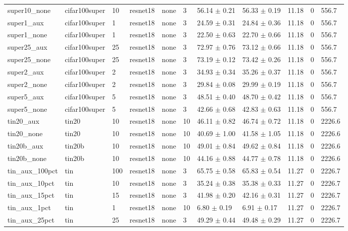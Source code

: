 \begin{tabular}{lllllllllll}
super10_none & cifar100super & 10 & resnet18 & none & 3 & 56.14 $\pm$ 0.21 & 56.33 $\pm$ 0.19 & 11.18 & 0 & 556.7 \\
super1_aux & cifar100super & 1 & resnet18 & none & 3 & 24.59 $\pm$ 0.31 & 24.84 $\pm$ 0.36 & 11.18 & 0 & 556.7 \\
super1_none & cifar100super & 1 & resnet18 & none & 3 & 22.50 $\pm$ 0.63 & 22.70 $\pm$ 0.66 & 11.18 & 0 & 556.7 \\
super25_aux & cifar100super & 25 & resnet18 & none & 3 & 72.97 $\pm$ 0.76 & 73.12 $\pm$ 0.66 & 11.18 & 0 & 556.7 \\
super25_none & cifar100super & 25 & resnet18 & none & 3 & 73.19 $\pm$ 0.12 & 73.42 $\pm$ 0.26 & 11.18 & 0 & 556.7 \\
super2_aux & cifar100super & 2 & resnet18 & none & 3 & 34.93 $\pm$ 0.34 & 35.26 $\pm$ 0.37 & 11.18 & 0 & 556.7 \\
super2_none & cifar100super & 2 & resnet18 & none & 3 & 29.84 $\pm$ 0.08 & 29.99 $\pm$ 0.19 & 11.18 & 0 & 556.7 \\
super5_aux & cifar100super & 5 & resnet18 & none & 3 & 48.51 $\pm$ 0.40 & 48.70 $\pm$ 0.42 & 11.18 & 0 & 556.7 \\
super5_none & cifar100super & 5 & resnet18 & none & 3 & 42.66 $\pm$ 0.68 & 42.83 $\pm$ 0.63 & 11.18 & 0 & 556.7 \\
tin20_aux & tin20 & 10 & resnet18 & none & 10 & 46.11 $\pm$ 0.82 & 46.74 $\pm$ 0.72 & 11.18 & 0 & 2226.6 \\
tin20_none & tin20 & 10 & resnet18 & none & 10 & 40.69 $\pm$ 1.00 & 41.58 $\pm$ 1.05 & 11.18 & 0 & 2226.6 \\
tin20b_aux & tin20b & 10 & resnet18 & none & 10 & 49.01 $\pm$ 0.84 & 49.62 $\pm$ 0.84 & 11.18 & 0 & 2226.6 \\
tin20b_none & tin20b & 10 & resnet18 & none & 10 & 44.16 $\pm$ 0.88 & 44.77 $\pm$ 0.78 & 11.18 & 0 & 2226.6 \\
tin_aux_100pct & tin & 100 & resnet18 & none & 3 & 65.75 $\pm$ 0.58 & 65.83 $\pm$ 0.54 & 11.27 & 0 & 2226.7 \\
tin_aux_10pct & tin & 10 & resnet18 & none & 3 & 35.24 $\pm$ 0.38 & 35.38 $\pm$ 0.33 & 11.27 & 0 & 2226.7 \\
tin_aux_15pct & tin & 15 & resnet18 & none & 3 & 41.98 $\pm$ 0.20 & 42.16 $\pm$ 0.31 & 11.27 & 0 & 2226.7 \\
tin_aux_1pct & tin & 1 & resnet18 & none & 10 & 6.80 $\pm$ 0.19 & 6.91 $\pm$ 0.17 & 11.27 & 0 & 2226.7 \\
tin_aux_25pct & tin & 25 & resnet18 & none & 3 & 49.29 $\pm$ 0.44 & 49.48 $\pm$ 0.29 & 11.27 & 0 & 2226.7 \\

\end{tabular}
